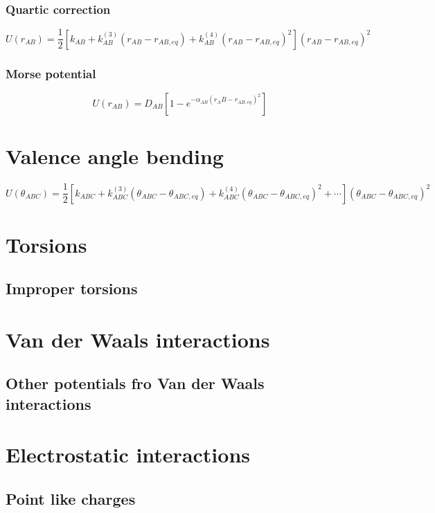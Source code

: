 		\subsubsection{Quartic correction}

		$$U(r_{AB}) = \frac{1}{2}[k_{AB}+k^{(3)}_{AB}(r_{AB}-r_{AB, eq}) + k^{(4)}_{AB}(r_{AB}-r_{AB,eq})^2](r_{AB}-r_{AB, eq})^2$$

		\subsubsection{Morse potential}

		$$U(r_{AB}) = D_{AB}[1-e^{-\alpha_{AB}(r_AB-r_{AB,eq})^2}]$$

\section{Valence angle bending}

$$U(\theta_{ABC}) = \frac{1}{2}[k_{ABC}+k^{(3)}_{ABC}(\theta_{ABC}-\theta_{ABC,eq})+k^{(4)}_{ABC}(\theta_{ABC}-\theta_{ABC,eq})^2+\cdots](\theta_{ABC}-\theta_{ABC, eq})^2$$

\section{Torsions}

	\subsection{Improper torsions}

\section{Van der Waals interactions}

	\subsection{Other potentials fro Van der Waals interactions}

\section{Electrostatic interactions}

	\subsection{Point like charges}

